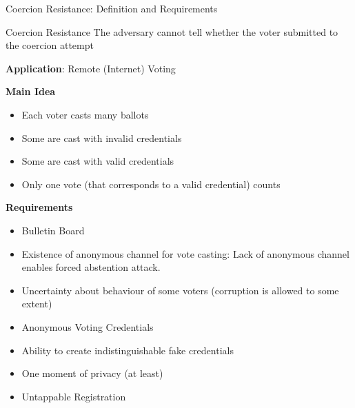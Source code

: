 \documentclass{beamer}
\begin{document}
\begin{frame}[allowframebreaks]{Coercion Resistance: Definition and Requirements}

\begin{block}{Coercion Resistance}
The adversary cannot tell whether the voter submitted to the coercion attempt
\end{block}

\textbf{Application}: Remote (Internet) Voting

\textbf{Main Idea \cite{juels2005coercion}}
\begin{itemize}
\item Each voter casts many ballots
\item Some are cast with invalid credentials
\item Some are cast with valid credentials
\item Only one vote (that corresponds to a valid credential) counts
\end{itemize}

\framebreak

\textbf{Requirements} 
\begin{itemize}
\item Bulletin Board
\item Existence of anonymous channel for vote casting: Lack of anonymous channel enables forced abstention attack.
\item Uncertainty about behaviour of some voters (corruption is allowed to some extent) 
\item Anonymous Voting Credentials
\item Ability to create indistinguishable fake credentials
\item One moment of privacy (at least)
\item Untappable Registration
\end{itemize}
\end{frame}
\end{document}
